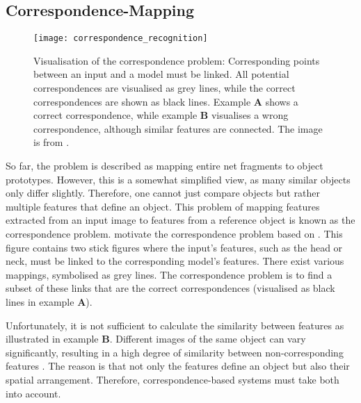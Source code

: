 \subsection{Correspondence-Mapping}
\begin{figure}[h]
    \centering
    \texttt{[image: correspondence\_recognition]}
    \caption[The visual correspondence problem]{Visualisation of the correspondence problem: Corresponding points between an input and a model must be linked. All potential correspondences are visualised as grey lines, while the correct correspondences are shown as black lines. Example $\boldsymbol{A}$ shows a correct correspondence, while example $\boldsymbol{B}$ visualises a wrong correspondence, although similar features are connected. The image is from \cite{wolfrum_recurrent_2008}.}
\end{figure}

So far, the problem is described as mapping entire net fragments to object prototypes.
However, this is a somewhat simplified view, as many similar objects only differ slightly.
Therefore, one cannot just compare objects but rather multiple features that define an object.
This problem of mapping features extracted from an input image to features from a reference object is known as the correspondence problem.
 motivate the correspondence problem based on . This figure contains two stick figures where the input's features, such as the head or neck, must be linked to the corresponding model's features.
There exist various mappings, symbolised as grey lines.
The correspondence problem is to find a subset of these links that are the correct correspondences (visualised as black lines in example $\boldsymbol{A}$). 

Unfortunately, it is not sufficient to calculate the similarity between features as illustrated in 
 example $\boldsymbol{B}$. Different images of the same object can vary significantly, resulting in a high degree of similarity between non-corresponding features . The reason is that not only the features define an object but also their spatial arrangement. Therefore, correspondence-based systems must take both into account.

